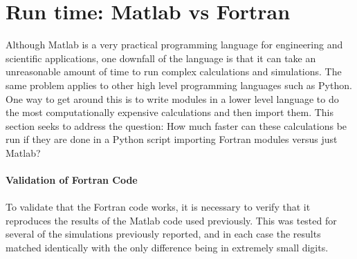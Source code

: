 \documentclass[]{article}
\theoremstyle{definition}
\numberwithin{equation}{section}
\numberwithin{equation}{section}
\begin{document}
\section{Run time: Matlab vs Fortran}
Although Matlab is a very practical programming language for engineering and scientific applications, one downfall of the language is that it can take an unreasonable amount of time to run complex calculations and simulations. The same problem applies to other high level programming languages such as Python. One way to get around this is to write modules in a lower level language to do the most computationally expensive calculations and then import them. This section seeks to address the question: How much faster can these calculations be run if they are done in a Python script importing Fortran modules versus just Matlab?
\\
\\
\textbf{Validation of Fortran Code}
\\
\\
To validate that the Fortran code works, it is necessary to verify that it reproduces the results of the Matlab code used previously. This was tested for several of the simulations previously reported, and in each case the results matched identically with the only difference being in extremely small digits. \\
\end{document}
